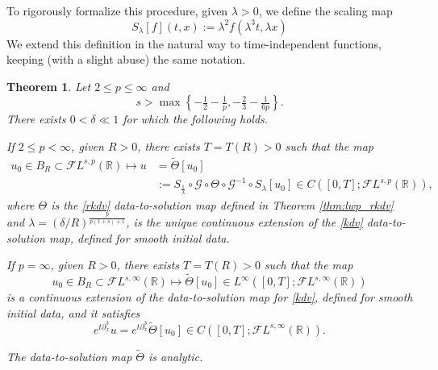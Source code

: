 \documentclass[%
11pt,  reqno]{amsart}
\newcommand{\5}{\textup{V}}
\newcommand{\noi}{\noindent}
\newcommand{\FL}{\mathcal{F} L}
\newcommand{\wt}{\widetilde}
\newcommand{\dx}{\partial_x}
\newtheorem{theorem}{Theorem} [section]
\theoremstyle{remark}
\newcommand{\R}{\mathbb{R}}
\newcommand{\Gc}{\mathcal{G}}
\numberwithin{equation}{section}
\numberwithin{theorem}{section}
\newcommand{\simao}[1]{\marginpar{\color{red} $\Leftarrow\Leftarrow\Leftarrow$}{\smallskip \noi\color{red}SIMAO: #1}\smallskip}
\begin{document}
To rigorously formalize this procedure,  given $\lambda>0$, we define the scaling map
   \begin{equation}
    \label{SR}
    S_\lambda[f](t,x) := \lambda^2 f(\lambda^3 t, \lambda x)
   \end{equation}
We extend this definition in the natural way to time-independent functions, keeping (with a slight abuse) the same notation.


\begin{theorem}\label{thm:wp_kdv_intro} Let $2\le p\le \infty$ and
$$s>\max\left\{-\tfrac12 - \tfrac1p, -\tfrac23-\tfrac1{6p}\right\}.$$
There exists $0<\delta\ll 1$ for which the following holds.

\vspace{1mm}

\noi{\rm(i)} If $2 \le p<\infty$, given $R>0$, there exists $T=T(R)>0$ such that the map
\begin{align}
u_0\in B_R\subset\FL^{s,p}(\R)\mapsto u& 
=\wt\Theta[u_0] 
\\
&:= S_{\frac1\lambda}\circ\mathcal{G}\circ\Theta  \circ \Gc^{-1}\circ S_\lambda[u_0]\in C([0,T];\FL^{s,p}(\R)),
\end{align}
where $\Theta$ is the \eqref{rkdv} data-to-solution map defined in Theorem \ref{thm:lwp_rkdv} and $\lambda=\left(\delta/R\right)^{\frac{p}{p(1+s)+1}}$,
is the unique continuous extension of the \eqref{kdv} data-to-solution map, defined for smooth initial data.

\vspace{1mm}

\smallskip

\noi{\rm(ii)} If $p=\infty$, given $R>0$, there exists $T=T(R)>0$ such that the map
\begin{equation}
u_0\in B_R\subset\FL^{s,\infty}(\R)\mapsto \wt\Theta[u_0]  \in L^\infty([0,T];\FL^{s,\infty}(\R))
\end{equation}
is a continuous extension of 
the data-to-solution map for \eqref{kdv}, defined for smooth initial data, and it satisfies
\begin{equation}
e^{t\dx^3} u = e^{t\dx^3} \wt\Theta[u_0] \in C([0,T] ; \FL^{s,\infty}(\R))
.
\end{equation}

{\noi{\rm(iii)} The data-to-solution map $\tilde{\Theta}$ is analytic.}
	\end{theorem}
\end{document}
